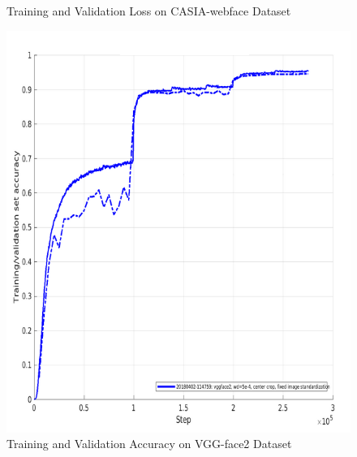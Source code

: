 \documentclass[a4paper,12pt, twoside]{NITKReport}
\begin{document}
\begin{figure}
\begin{minipage}[b]{0.4\textwidth}
    \caption{Training and Validation Loss on CASIA-webface Dataset}
    \label{csia_loss}
  \end{minipage}
\end{figure}

\begin{figure}
\centering
\begin{minipage}[b]{0.4\textwidth}
   \includegraphics[width=\textwidth]{vgg_acc.png}
    \caption{Training and Validation Accuracy on VGG-face2 Dataset}
    \label{vggface_acc}
  \end{minipage}
  \hfill
  \begin{minipage}[b]{0.4\textwidth}

\end{minipage}
\end{figure}
\end{document}

